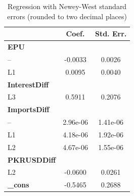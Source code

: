 \documentclass[11pt]{article}
\begin{document}
\begin{table}[ht]
\centering
\begin{tabular}{lcc}
\hline
 & Coef. & Std. Err. \\ 
\hline
\textbf{EPU} & & \\
-- & -0.0033 & 0.0026 \\
L1 & 0.0095 & 0.0040 \\
\textbf{InterestDiff} & & \\
L3 & 0.5911 & 0.2076 \\
\textbf{ImportsDiff} & & \\
-- & 2.96e-06 & 1.41e-06 \\
L1 & 4.18e-06 & 1.92e-06 \\
L2 & 4.67e-06 & 1.55e-06 \\
\textbf{PKRUSDDiff} & & \\
L2 & -0.0600 & 0.0261 \\
\textbf{\_cons} & -0.5465 & 0.2688 \\
\hline
\end{tabular}
\caption{Regression with Newey-West standard errors (rounded to two decimal places)}
\label{table:results_rounded}
\end{table}
\end{document}
